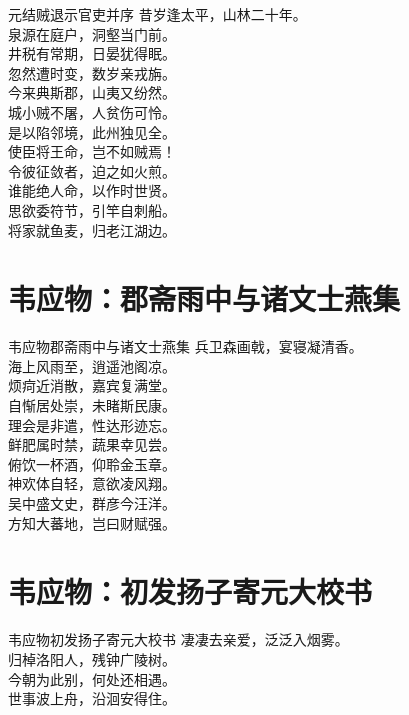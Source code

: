 \documentclass[12pt,oneside,a5paper]{book}
\begin{document}
\begin{poemzh}{元结}{贼退示官吏并序}
昔岁逢太平，山林二十年。\\
泉源在庭户，洞壑当门前。\\
井税有常期，日晏犹得眠。\\
忽然遭时变，数岁亲戎旃。\\
今来典斯郡，山夷又纷然。\\
城小贼不屠，人贫伤可怜。\\
是以陷邻境，此州独见全。\\
使臣将王命，岂不如贼焉！\\
令彼征敛者，迫之如火煎。\\
谁能绝人命，以作时世贤。\\
思欲委符节，引竿自刺船。\\
将家就鱼麦，归老江湖边。\\ 
\end{poemzh}


\chapter{韦应物：郡斋雨中与诸文士燕集}
\begin{poemzh}{韦应物}{郡斋雨中与诸文士燕集}
兵卫森画戟，宴寝凝清香。\\
海上风雨至，逍遥池阁凉。\\
烦疴近消散，嘉宾复满堂。\\
自惭居处崇，未睹斯民康。\\
理会是非遣，性达形迹忘。\\
鲜肥属时禁，蔬果幸见尝。\\
俯饮一杯酒，仰聆金玉章。\\
神欢体自轻，意欲凌风翔。\\
吴中盛文史，群彦今汪洋。\\
方知大蕃地，岂曰财赋强。\\ 
\end{poemzh}

\chapter{韦应物：初发扬子寄元大校书}
\begin{poemzh}{韦应物}{初发扬子寄元大校书}
凄凄去亲爱，泛泛入烟雾。\\
归棹洛阳人，残钟广陵树。\\
今朝为此别，何处还相遇。\\
世事波上舟，沿洄安得住。\\ 
\end{poemzh}
\end{document}

